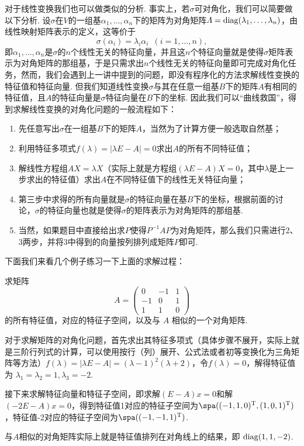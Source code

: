 对于线性变换我们也可以做类似的分析. 事实上，若$\sigma$可对角化，我们可以简要做以下分析. 设$\sigma$在$V$的一组基$\alpha_1,\ldots,\alpha_n$下的矩阵为对角矩阵$\varLambda=\operatorname{diag}(\lambda_1,\ldots,\lambda_n)$，由线性映射矩阵表示的定义，这等价于
\[\sigma(\alpha_i)=\lambda_i\alpha_i\enspace(i=1,\ldots,n),\]
即$\alpha_1,\ldots,\alpha_n$是$\sigma$的$n$个线性无关的特征向量，并且这$n$个特征向量就是使得$\sigma$矩阵表示为对角矩阵的那组基，于是只需求出$n$个线性无关的特征向量即可完成对角化任务，然而，我们会遇到上一讲中提到的问题，即没有程序化的方法求解线性变换的特征值和特征向量. 但我们知道线性变换$\sigma$与其在任意一组基$B$下的矩阵$A$有相同的特征值，且$A$的特征向量是$\sigma$特征向量在$B$下的坐标. 因此我们可以``曲线救国''，得到求解线性变换的对角化问题的一般流程如下：

\begin{enumerate}
    \item 先任意写出$\sigma$在一组基$B$下的矩阵$A$，当然为了计算方便一般选取自然基；

    \item 利用特征多项式$f(\lambda)=|\lambda E-A|=0$求出$A$的所有不同特征值；

    \item 解线性方程组$AX=\lambda X$（实际上就是方程组$(\lambda E-A)X=0$，其中$\lambda$是上一步求出的特征值）求出$A$在不同特征值下的线性无关特征向量；

    \item 第三步中求得的所有向量就是$\sigma$的特征向量在基$B$下的坐标，根据前面的讨论，$\sigma$的特征向量也就是使得$\sigma$的矩阵表示为对角矩阵的那组基.

    \item 当然，如果题目中直接给出求$P$使得$P^{-1}AP$为对角矩阵，那么我们只需进行2、3两步，并将3中得到的向量按列排列成矩阵$P$即可.
\end{enumerate}

下面我们来看几个例子练习一下上面的求解过程：
\begin{example}
    求矩阵
    \[A=\begin{pmatrix}
            0  & -1 & 1 \\
            -1 & 0  & 1 \\
            1  & 1  & 0
        \end{pmatrix}\]
    的所有特征值，对应的特征子空间，以及与 $A$ 相似的一个对角矩阵.
\end{example}

\begin{solution}
    对于求解矩阵的对角化问题，首先求出其特征多项式（具体步骤不展开，实际上就是三阶行列式的计算，可以使用按行（列）展开、公式法或者初等变换化为三角矩阵等方法）$f(\lambda)=|\lambda E-A|=(\lambda-1)^2(\lambda+2)$，令$f(\lambda)=0$，解得特征值为 $\lambda_1=\lambda_2=1,\lambda_3=-2$.

    接下来求解特征向量和特征子空间，即求解$(E-A)x=0$和解$(-2E-A)x=0$，得到特征值1对应的特征子空间为$\spa((-1,1,0)^{\mathrm{T}},(1,0,1)^{\mathrm{T}})$，特征值-2对应的特征子空间为$\spa((-1,-1,1)^{\mathrm{T}})$.

    与$A$相似的对角矩阵实际上就是特征值排列在对角线上的结果，即 $\operatorname{diag}(1,1,-2)$.
\end{solution}


